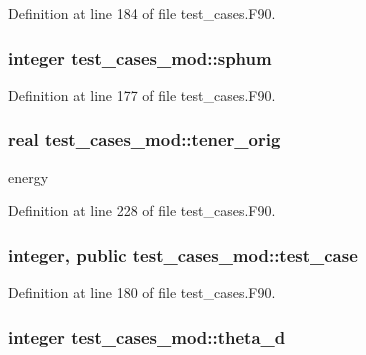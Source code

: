 Definition at line 184 of file test\-\_\-cases.\-F90.

\subsubsection[{sphum}]{\setlength{\rightskip}{0pt plus 5cm}integer test\-\_\-cases\-\_\-mod\-::sphum\hspace{0.3cm}{\ttfamily [private]}}\label{classtest__cases__mod_a2fb47f8d0671dcb58a188245f3561fc0}


Definition at line 177 of file test\-\_\-cases.\-F90.

\subsubsection[{tener\-\_\-orig}]{\setlength{\rightskip}{0pt plus 5cm}real test\-\_\-cases\-\_\-mod\-::tener\-\_\-orig\hspace{0.3cm}{\ttfamily [private]}}\label{classtest__cases__mod_a2a10be3be35d2f512f6e3b83652672eb}


energy 



Definition at line 228 of file test\-\_\-cases.\-F90.

\subsubsection[{test\-\_\-case}]{\setlength{\rightskip}{0pt plus 5cm}integer, public test\-\_\-cases\-\_\-mod\-::test\-\_\-case}\label{classtest__cases__mod_a7b2088f8d78d58d88ac4f8cf8f80dea8}


Definition at line 180 of file test\-\_\-cases.\-F90.

\subsubsection[{theta\-\_\-d}]{\setlength{\rightskip}{0pt plus 5cm}integer test\-\_\-cases\-\_\-mod\-::theta\-\_\-d\hspace{0.3cm}{\ttfamily [private]}}\label{classtest__cases__mod_adc983b10c9af89dbc2a6b4cbd5957918}


